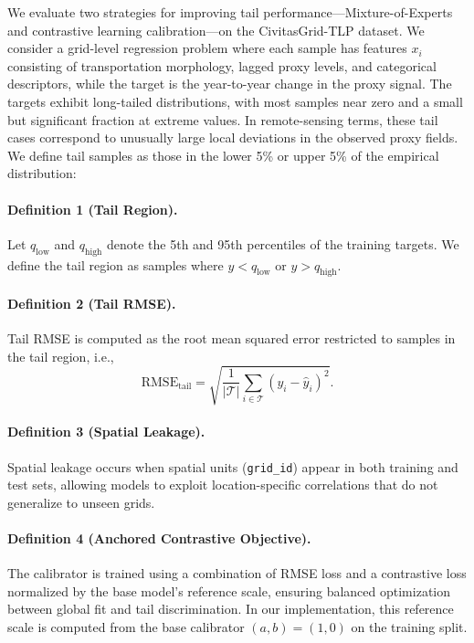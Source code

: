 \documentclass[preprint,12pt]{elsarticle}
\begin{document}
We evaluate two strategies for improving tail performance---Mixture-of-Experts and contrastive learning calibration---on the CivitasGrid-TLP dataset. We consider a grid-level regression problem where each sample has features $x_i$ consisting of transportation morphology, lagged proxy levels, and categorical descriptors, while the target is the year-to-year change in the proxy signal. The targets exhibit long-tailed distributions, with most samples near zero and a small but significant fraction at extreme values. In remote-sensing terms, these tail cases correspond to unusually large local deviations in the observed proxy fields. We define tail samples as those in the lower 5\% or upper 5\% of the empirical distribution:

\paragraph{Definition 1 (Tail Region).}
Let $q_{\mathrm{low}}$ and $q_{\mathrm{high}}$ denote the 5th and 95th percentiles of the training targets. We define the tail region as samples where $y < q_{\mathrm{low}}$ or $y > q_{\mathrm{high}}$.

\paragraph{Definition 2 (Tail RMSE).}
Tail RMSE is computed as the root mean squared error restricted to samples in the tail region, i.e.,
\begin{equation}
\mathrm{RMSE}_{\mathrm{tail}}=\sqrt{\frac{1}{|\mathcal{T}|}\sum_{i\in\mathcal{T}}(y_i-\hat{y}_i)^2}.
\end{equation}

\paragraph{Definition 3 (Spatial Leakage).}
Spatial leakage occurs when spatial units (\texttt{grid\_id}) appear in both training and test sets, allowing models to exploit location-specific correlations that do not generalize to unseen grids.

\paragraph{Definition 4 (Anchored Contrastive Objective).}
The calibrator is trained using a combination of RMSE loss and a contrastive loss normalized by the base model's reference scale, ensuring balanced optimization between global fit and tail discrimination. In our implementation, this reference scale is computed from the base calibrator $(a,b)=(1,0)$ on the training split.
\end{document}
